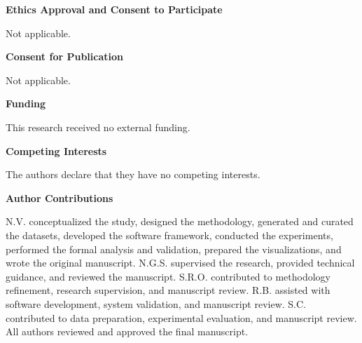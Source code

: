 \documentclass[conference]{IEEEtran}
\begin{document}
\textbf{Ethics Approval and Consent to Participate}

Not applicable.

\textbf{Consent for Publication}

Not applicable.

\textbf{Funding}

This research received no external funding.

\textbf{Competing Interests}

The authors declare that they have no competing interests.

\textbf{Author Contributions}

N.V. conceptualized the study, designed the methodology, generated and curated the datasets, developed the software framework, conducted the experiments, performed the formal analysis and validation, prepared the visualizations, and wrote the original manuscript. N.G.S. supervised the research, provided technical guidance, and reviewed the manuscript. S.R.O. contributed to methodology refinement, research supervision, and manuscript review. R.B. assisted with software development, system validation, and manuscript review. S.C. contributed to data preparation, experimental evaluation, and manuscript review. All authors reviewed and approved the final manuscript.




\nocite{*}

\end{document}
